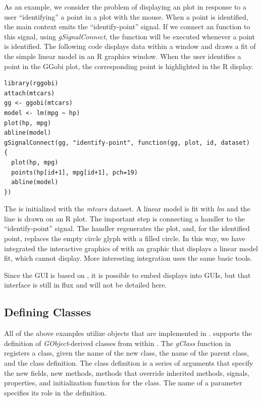 \documentclass[article]{jss}
\begin{document}
As an example, we consider the problem of displaying an 
plot in
response to a user ``identifying'' a point in a  plot with
the mouse.
When a  point is identified, the main  context
emits
the ``identify-point'' signal. If we connect an  function
to
this signal, using \emph{gSignalConnect}, the function will be
executed whenever a point is identified. 
The following code displays data within a  window and
draws a fit of the simple linear model in an R graphics window.
When the user identifies a point in the GGobi plot, the corresponding
point is highlighted in the R display.
\begin{verbatim}
library(rggobi)
attach(mtcars)
gg <- ggobi(mtcars)
model <- lm(mpg ~ hp)
plot(hp, mpg)
abline(model)
gSignalConnect(gg, "identify-point", function(gg, plot, id, dataset)
{
  plot(hp, mpg)
  points(hp[id+1], mpg[id+1], pch=19)
  abline(model)
})
\end{verbatim}
The  is initialized with the \emph{mtcars} dataset. 
A linear model is fit with \emph{lm} and the line is drawn on an R
plot. The 
important step is connecting a handler to the ``identify-point''
signal. The
handler regenerates the  plot, and, for the identified
point, 
replaces the empty circle glyph with a filled circle.
In this way, we have integrated the interactive graphics of
 with an
 graphic that displays a linear model fit, which
 cannot
display. More interesting integration uses the same basic tools.

Since the  GUI is based on , it is possible to
embed 
 displays into  GUIs, but that interface is
still in flux
and will not be detailed here.

\subsection[Defining GObject Classes]{Defining  Classes}

All of the above examples utilize objects that are implemented in
.
 supports the definition of \emph{GObject}-derived classes
from within
.  The \emph{gClass} function in  registers a 
class, given the name of the new class, the name of the parent class,
and the class 
definition. The class definition is a series of arguments that specify the new fields, new methods, 
methods that override inherited methods,
 signals, properties, and
initialization function for the class. The name of a parameter
specifies
its role in the definition. 
\end{document}
